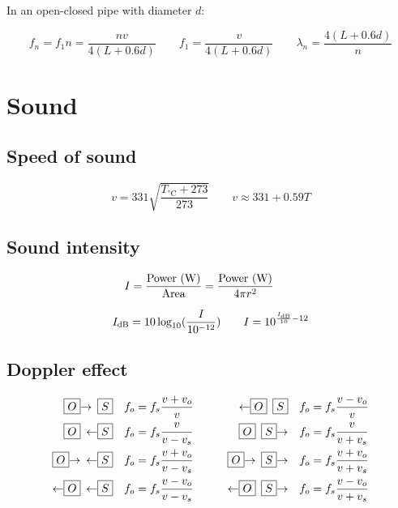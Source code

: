 In an open-closed pipe with diameter $d$:

\[
	f_n = f_1 n = \frac{nv}{4(L + 0.6d)} \qquad f_1 = \frac{v}{4(L + 0.6d)} \qquad \lambda_n = \frac{4(L + 0.6d)}{n}
\]

\section{Sound}

\subsection{Speed of sound}

\[
	v = 331 \sqrt{\frac{T_{\text{°C}}+273}{273}} \qquad v \approx 331 + 0.59T
\]

\subsection{Sound intensity}

\[
	I = \frac{\text{Power (\watt)}}{\text{Area}} = \frac{\text{Power (\watt)}}{4 \pi r^2} \qquad
\]

\[
	I_\decibel = 10 \log_{10} (\frac{I}{10^{-12}}) \qquad
	I = 10^{\frac{I_\decibel}{10} - 12}
\]

\subsection{Doppler effect}

\[\begin{aligned}
	\boxed{O}\smash{\rightarrow} \enspace \boxed{S} \quad f_o &= f_s \frac{v + v_o}{v} \qquad &
	\smash{\leftarrow}\boxed{O} \enspace \boxed{S} \quad f_o &= f_s \frac{v - v_o}{v}
	\\
	\boxed{O} \enspace \smash{\leftarrow}\boxed{S}  \quad f_o &= f_s \frac{v}{v - v_s} \qquad &
	\boxed{O} \enspace \boxed{S}\smash{\rightarrow} \quad f_o &= f_s \frac{v}{v + v_s}
	\\
	\boxed{O}\smash{\rightarrow} \enspace \smash{\leftarrow}\boxed{S} \quad f_o &= f_s \frac{v + v_o}{v - v_s} \qquad &
	\boxed{O}\smash{\rightarrow} \enspace \boxed{S}\smash{\rightarrow} \quad f_o &= f_s \frac{v + v_o}{v + v_s}
	\\
	\smash{\leftarrow}\boxed{O} \enspace \smash{\leftarrow}\boxed{S} \quad f_o &= f_s \frac{v - v_o}{v - v_s} \qquad &
	\smash{\leftarrow}\boxed{O} \enspace \boxed{S}\smash{\rightarrow} \quad f_o &= f_s \frac{v - v_o}{v + v_s}
\end{aligned}\]


